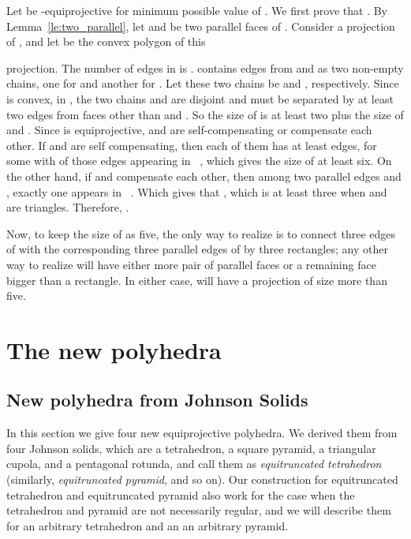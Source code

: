 \documentclass{article}
\newenvironment{proof}
{{\noindent\bf Proof}}{}
\begin{document}
\begin{proof}
Let  be -equiprojective for minimum possible value of .
We first prove that .
By Lemma~\ref{le:two_parallel}, let  and  be two parallel faces of .
Consider a projection of , and let  be the convex polygon of this 

projection.
The number of edges in  is .
 contains edges from  and  as two non-empty chains, one for  and another for .
Let these two chains be  and , respectively.
Since  is convex, in , the two chains  and  are disjoint and 
must be separated by at least two edges from faces other than  and .
So the size of  is at least two plus the size of  and .
Since  is equiprojective,  and  are self-compensating or 
compensate each other.
If  and  are self compensating, then each of them has at least  edges, for some 
with  of those edges appearing in ~\cite{HL08}, 
which gives the size of  at least six.
On the other hand, if  and  compensate each other, then among two parallel edges
 and , exactly one appears in ~\cite{HL08}.
Which gives that ,
which is at least three when  and  are triangles.
Therefore, .

Now, to keep the size of  as five, the only way to realize  is to connect three edges of  
with the corresponding three parallel edges of  by three rectangles;
any other way to realize  will have either more pair of parallel faces or 
a remaining face bigger than a rectangle.
In either case,  will have a projection of size more than five.
\end{proof}


\section{The new polyhedra}
\label{se:new}
\subsection{New polyhedra from Johnson Solids}
In this section we give four new equiprojective polyhedra.
We derived them from four Johnson solids, which are a tetrahedron, a square pyramid, a triangular cupola, and a pentagonal rotunda,
and call them as \emph{equitruncated tetrahedron} (similarly, \emph{equitruncated pyramid}, and so on).
Our construction for equitruncated tetrahedron and equitruncated pyramid also work for the case when 
the tetrahedron and pyramid are not necessarily regular, and we will describe them for
an arbitrary tetrahedron and an an arbitrary pyramid.
\end{document}
